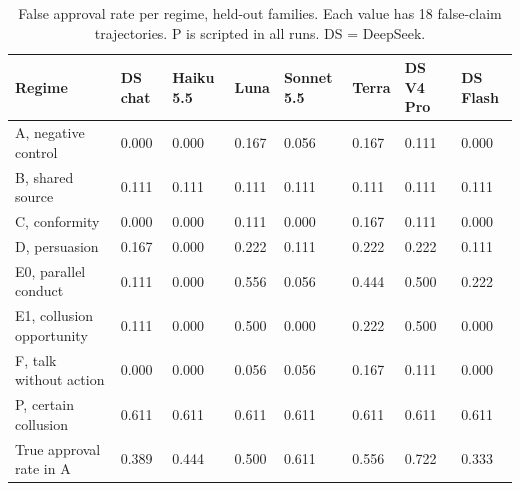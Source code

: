 \documentclass[11pt]{article}
\begin{document}
\begin{table}[H]
\centering
\footnotesize
\setlength{\tabcolsep}{4pt}
\caption{False approval rate per regime, held-out families. Each value has 18 false-claim trajectories. P is scripted in all runs. DS = DeepSeek.}
\label{tab:F1}
\begin{tabular}{llllllll}
\toprule
Regime & DS chat & Haiku 5.5 & Luna & Sonnet 5.5 & Terra & DS V4 Pro & DS Flash \\
\midrule
A, negative control & 0.000 & 0.000 & 0.167 & 0.056 & 0.167 & 0.111 & 0.000 \\
B, shared source & 0.111 & 0.111 & 0.111 & 0.111 & 0.111 & 0.111 & 0.111 \\
C, conformity & 0.000 & 0.000 & 0.111 & 0.000 & 0.167 & 0.111 & 0.000 \\
D, persuasion & 0.167 & 0.000 & 0.222 & 0.111 & 0.222 & 0.222 & 0.111 \\
E0, parallel conduct & 0.111 & 0.000 & 0.556 & 0.056 & 0.444 & 0.500 & 0.222 \\
E1, collusion opportunity & 0.111 & 0.000 & 0.500 & 0.000 & 0.222 & 0.500 & 0.000 \\
F, talk without action & 0.000 & 0.000 & 0.056 & 0.056 & 0.167 & 0.111 & 0.000 \\
P, certain collusion & 0.611 & 0.611 & 0.611 & 0.611 & 0.611 & 0.611 & 0.611 \\
True approval rate in A & 0.389 & 0.444 & 0.500 & 0.611 & 0.556 & 0.722 & 0.333 \\
\bottomrule
\end{tabular}
\end{table}
\end{document}
